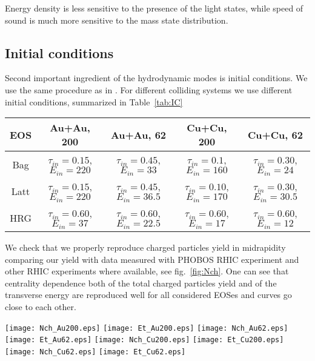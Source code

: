 \documentclass[aps,twocolumn,groupedaddress,superscriptaddress,floatfix]{revtex4}
\begin{document}
Energy density is less sensitive to the presence of the light
states, while speed of sound is much more sensitive to the mass
state distribution.

\subsection{Initial conditions}
Second important ingredient of the hydrodynamic modes is initial
conditions. We use the same procedure as in \cite{DDE-DP-1}. For
different colliding systems we use different initial conditions,
summarized in Table~\ref{tab:IC}

\begin{table*}
\caption{Initial conditions for different EOSes and colliding
systems}\label{tab:IC}
\begin{tabular}{|c|c|c|c|c|}
  \hline
  EOS  & Au+Au, 200                     & Au+Au, 62   & Cu+Cu, 200 &  Cu+Cu, 62 \\
  \hline
  Bag  & $\tau_{in}=0.15$, $E_{in}=220$ & $\tau_{in}=0.45$, $E_{in}=33$ & $\tau_{in}=0.1$, $E_{in}=160$ & $\tau_{in}=0.30$, $E_{in}=24$ \\
  Latt & $\tau_{in}=0.15$, $E_{in}=220$ & $\tau_{in}=0.45$, $E_{in}=36.5$ &  $\tau_{in}=0.10$, $E_{in}=170$  & $\tau_{in}=0.30$, $E_{in}=30.5$ \\
  HRG  & $\tau_{in}=0.60$, $E_{in}=37$  & $\tau_{in}=0.60$, $E_{in}=22.5$ & $\tau_{in}=0.60$, $E_{in}=17$ & $\tau_{in}=0.60$, $E_{in}=12$ \\
  \hline
\end{tabular}
\end{table*}

We check that we properly reproduce charged particles yield in
midrapidity comparing our yield with data measured with PHOBOS
RHIC experiment and other RHIC experiments where available, see
fig.~\ref{fig:Nch}. One can see that centrality dependence both of
the total charged particles yield and of the transverse energy are
reproduced well for all considered EOSes and curves go close to
each other.

\begin{figure*}[t]
\texttt{[image: Nch\_Au200.eps]}
\texttt{[image: Et\_Au200.eps]}
\texttt{[image: Nch\_Au62.eps]}
\texttt{[image: Et\_Au62.eps]}
\texttt{[image: Nch\_Cu200.eps]}
\texttt{[image: Et\_Cu200.eps]}
\texttt{[image: Nch\_Cu62.eps]}
\texttt{[image: Et\_Cu62.eps]}
\caption{Normalized charged particles density and transverse
energy density calculated with different EOSes.}\label{fig:Nch}
\end{figure*}
\end{document}
